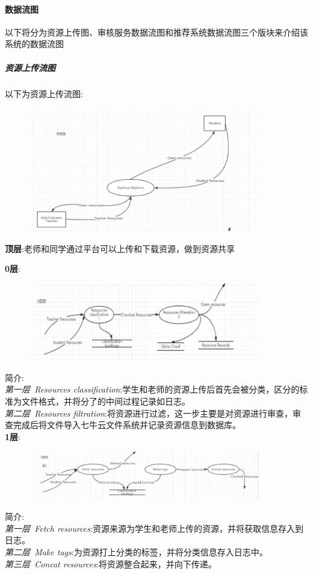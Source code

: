 \documentclass[UTF8]{ctexart}
\begin{document}
\paragraph{数据流图}
以下将分为资源上传图、审核服务数据流图和推荐系统数据流图三个版块来介绍该系统的数据流图
\subparagraph*{资源上传流图}
以下为资源上传流图:\\
\begin{figure}[H]
\centering
\includegraphics[width = 0.9\textwidth]{upload-df.png}
\end{figure}

\textbf{顶层}:老师和同学通过平台可以上传和下载资源，做到资源共享

\textbf{0层}:\\
\begin{figure}[H]
\centering
\includegraphics[width = 0.9\textwidth]{upload0-df.png}
\end{figure}
简介:\\
\emph{第一层~Resources classification}:学生和老师的资源上传后首先会被分类，区分的标准为文件格式，并将分了的中间过程记录如日志。\\
\emph{第二层~Resources filtration}:将资源进行过滤，这一步主要是对资源进行审查，审查完成后将文件导入七牛云文件系统并记录资源信息到数据库。\\

\textbf{1层}:\\
\begin{figure}[H]
\centering
\includegraphics[width = 0.9\textwidth]{upload1-df.png}
\end{figure}
简介:\\
\emph{第一层~Fetch resources}:资源来源为学生和老师上传的资源，并将获取信息存入到日志。\\
\emph{第二层~Make tags}:为资源打上分类的标签，并将分类信息存入日志中。\\
\emph{第三层~Concat resources}:将资源整合起来，并向下传递。\\
\end{document}
